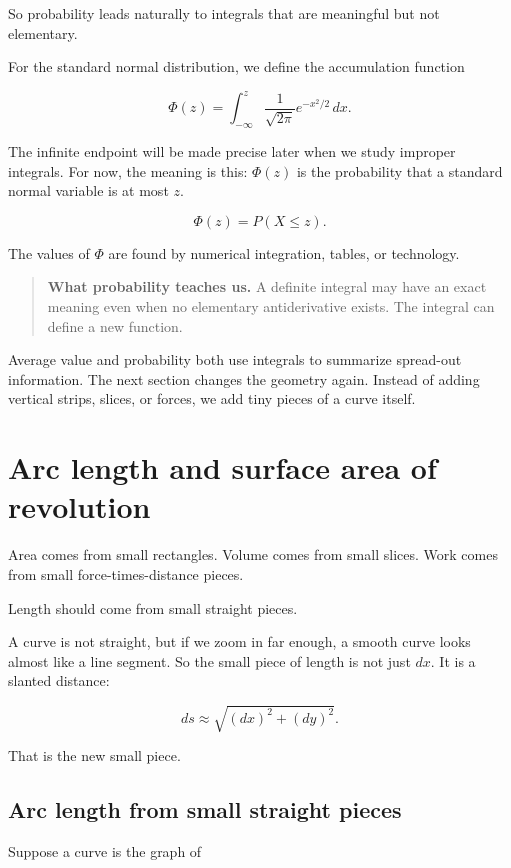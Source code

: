 So probability leads naturally to integrals that are meaningful but not elementary.

For the standard normal distribution, we define the accumulation function

\[
\Phi(z)=\int_{-\infty}^{z}
\frac1{\sqrt{2\pi}}e^{-x^2/2}\,dx.
\]

The infinite endpoint will be made precise later when we study improper integrals.
For now, the meaning is this: \(\Phi(z)\) is the probability that a standard normal
variable is at most \(z\).

\[
\boxed{
\Phi(z)=P(X\le z).
}
\]

The values of \(\Phi\) are found by numerical integration, tables, or technology.

\begin{quote}
\textbf{What probability teaches us.}
A definite integral may have an exact meaning even when no elementary antiderivative
exists.  The integral can define a new function.
\end{quote}

Average value and probability both use integrals to summarize spread-out information.
The next section changes the geometry again.  Instead of adding vertical strips, slices,
or forces, we add tiny pieces of a curve itself.

\section{Arc length and surface area of revolution}
\label{sec:arc-length-surface-area-revolution}

Area comes from small rectangles.  Volume comes from small slices.  Work comes from
small force-times-distance pieces.

Length should come from small straight pieces.

A curve is not straight, but if we zoom in far enough, a smooth curve looks almost like
a line segment.  So the small piece of length is not just \(dx\).  It is a slanted distance:

\[
ds\approx \sqrt{(dx)^2+(dy)^2}.
\]

That is the new small piece.

\subsection{Arc length from small straight pieces}
\label{subsec:arc-length-small-straight-pieces}

Suppose a curve is the graph of

